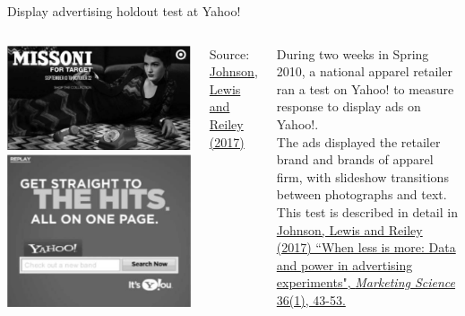 \documentclass[10pt, aspectratio=169]{beamer}
\newcommand{\source}[1]{\begin{flushright} \footnotesize Source: {#1} \end{flushright} \normalsize}
\begin{document}
\begin{frame}{Display advertising holdout test at Yahoo!}
\begin{columns}
\includegraphics[width=\textwidth]{images/johnsonetaltest.png}\\
\includegraphics[width=\textwidth]{images/johnsonetalcontrol.png}
\source{\href{https://github.com/eleafeit/ad_response_tutorial/blob/master/Papers/JohnsonLewisReiley2017WhenLessIsMore.pdf}{Johnson, Lewis and Reiley (2017)}}
During two weeks in Spring 2010, a national apparel retailer ran a test on Yahoo! to measure response to \alert{display ads} on Yahoo!. \\
\bigskip
The ads displayed the retailer brand and brands of apparel firm, with slideshow transitions between photographs and text. \\
\bigskip
This test is described in detail in \href{https://github.com/eleafeit/ad_response_tutorial/blob/master/Papers/JohnsonLewisReiley2017WhenLessIsMore.pdf}{Johnson, Lewis and Reiley (2017) ``When less is more: Data and power in advertising experiments", \textit{Marketing Science} 36(1), 43-53.}  
\end{columns}
\end{frame}
\end{document}
